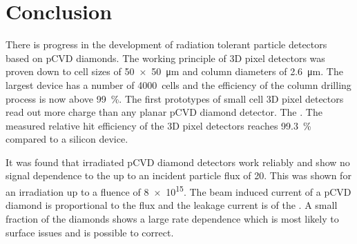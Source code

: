 \section{Conclusion}
There is progress in the development of radiation tolerant particle detectors based on \ac{pCVD} diamonds. The working principle of 3D pixel detectors was proven down to cell sizes of \SI{50x50}{\micro\meter} and column diameters of \SI{2.6}{\micro\meter}. The largest device has a number of \SI{4000}{cells} and the efficiency of the column drilling process is now above \SI{99}{\%}. The first prototypes of small cell 3D pixel detectors read out more charge than any planar \ac{pCVD} diamond detector. The . The measured relative hit efficiency of the 3D pixel detectors reaches \SI{99.3}{\%} compared to a silicon device.\par
It was found that irradiated \ac{pCVD} diamond detectors work reliably and show no signal dependence to the  up to an incident particle flux of \SI{20}{\mhzcm}. This was shown for an irradiation up to a fluence of \SI{8e15}{\ncm}. The beam induced current of a \ac{pCVD} diamond is proportional to the flux and the leakage current is of the . A small fraction of the diamonds shows a large rate dependence which is most likely to surface issues and is possible to correct.
